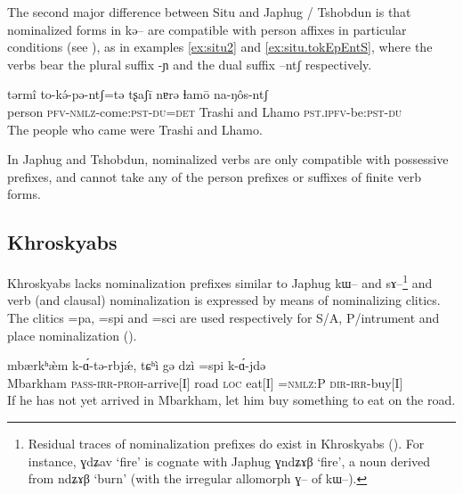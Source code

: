 \documentclass[oldfontcommands,oneside,a4paper,11pt]{article}
\newcommand{\ipa}[1]{{\phon #1}} %
\begin{document}
    
  The second major difference between Situ and Japhug / Tshobdun  is that nominalized forms in \ipa{kə--} are compatible with person affixes in particular conditions (see \citealt[11-12]{jacksonlin07}), as in examples \ref{ex:situ2} and \ref{ex:situ.tokEpEntS}, where the verbs bear  the plural suffix \ipa{-ɲ} and the dual suffix \ipa{--ntʃ} respectively.  

 \begin{exe}
\ex \label{ex:situ.tokEpEntS}
\gll
\ipa{tərmî}  	\ipa{to-kə́-pə-ntʃ=tə}  	\ipa{tʂaʃī}  	\ipa{nɐrə}  	\ipa{ɬamō}  	\ipa{na-ŋôs-ntʃ}  	\\
person \textsc{pfv-nmlz}-come:\textsc{pst}-\textsc{du=det} Trashi and Lhamo \textsc{pst.ipfv}-be:\textsc{pst}-\textsc{du} \\
\glt The people who came were Trashi and Lhamo.
  \end{exe}
  
  In Japhug and Tshobdun, nominalized verbs are only compatible with possessive prefixes, and cannot take any of the person prefixes or suffixes of finite verb forms.
  
  
  

\subsection{Khroskyabs}

Khroskyabs lacks nominalization prefixes similar to Japhug \ipa{kɯ--} and \ipa{sɤ--}\footnote{Residual traces of nominalization prefixes do exist in Khroskyabs (\citealt{jacques12incorp}). For instance, \ipa{ɣdʑav} ‘fire’ is cognate with  Japhug \ipa{ɣndʑɤβ} ‘fire’, a  noun derived from \ipa{ndʑɤβ} `burn' (with the irregular allomorph \ipa{ɣ--} of \ipa{kɯ--}).} and verb (and clausal) nominalization is expressed by means of nominalizing clitics. The clitics \ipa{=pa}, \ipa{=spi} and \ipa{=sci} are used respectively for S/A, P/intrument and place nominalization (\citealt[134]{lai13affixale}).



\begin{exe}
\ex
\gll
\ipa{mbærkʰæ̀m}  	\ipa{k-ɑ́-tə-rbjǽ,}  	\ipa{tɕʰì}  	\ipa{gə}  	\ipa{dzì} =\ipa{spi}  	\ipa{k-ɑ́-jdə}  \\
Mbarkham \textsc{pass-irr-proh}-arrive[I] road \textsc{loc} eat[I] =\textsc{nmlz:P} \textsc{dir-irr}-buy[I] \\
\glt If he has not yet arrived in Mbarkham, let him buy something to eat on the road.
\end{exe}
\end{document}
